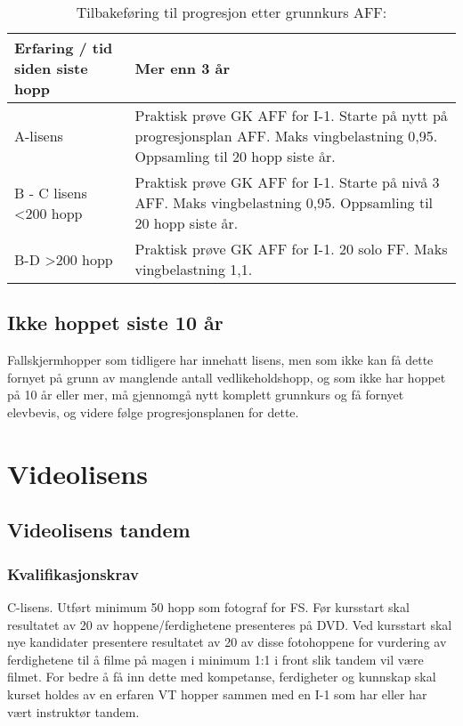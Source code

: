 \begin{table}
	\caption{Tilbakeføring til progresjon etter grunnkurs AFF:}
	\begin{tabular}{ | p{2cm} | p{8cm} | }
		\hline
		Erfaring / tid siden siste hopp & Mer enn 3 år \\
		\hline
		A-lisens & Praktisk prøve GK AFF for I-1. Starte på nytt på progresjonsplan AFF. Maks vingbelastning 0,95. Oppsamling til 20 hopp siste år. \\
		\hline
		B - C lisens \textless 200 hopp & Praktisk prøve GK AFF for I-1. Starte på nivå 3 AFF. Maks vingbelastning 0,95. Oppsamling til 20 hopp siste år. \\
		\hline
		B-D \textgreater 200 hopp & Praktisk prøve GK AFF for I-1. 20 solo FF. Maks vingbelastning 1,1. \\
		\hline
	\end{tabular}
\end{table}

\subsection{Ikke hoppet siste 10 år}
Fallskjermhopper som tidligere har innehatt lisens, men som ikke kan få dette fornyet på grunn av manglende antall vedlikeholdshopp, og som ikke har hoppet på 10 år eller mer, må gjennomgå nytt komplett grunnkurs og få fornyet elevbevis, og videre følge progresjonsplanen for dette.

\section{Videolisens}
\subsection{Videolisens tandem}
\subsubsection{Kvalifikasjonskrav}
C-lisens. Utført minimum 50 hopp som fotograf for FS. Før kursstart skal resultatet av 20 av hoppene/ferdighetene presenteres på DVD. Ved kursstart skal nye kandidater presentere resultatet av 20 av disse fotohoppene for vurdering av ferdighetene til å filme på magen i minimum 1:1 i front slik tandem vil være filmet. For bedre å få inn dette med kompetanse, ferdigheter og kunnskap skal kurset holdes av en erfaren VT hopper sammen med en I-1 som har eller har vært instruktør tandem.


